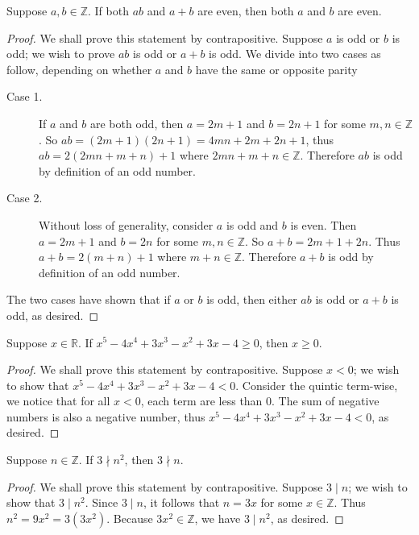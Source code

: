 \documentclass{exam}
\begin{document}
\begin{proposition}{5.7}
    Suppose $a,b\in\mathbb Z$. If both $ab$ and $a+b$ are even, then both $a$ and $b$ are even.
\end{proposition}

\begin{proof}
    We shall prove this statement by contrapositive. Suppose $a$ is odd or $b$ is odd; we wish to prove $ab$ is odd or $a+b$ is odd. We divide into two cases as follow, depending on whether $a$ and $b$ have the same or opposite parity
    \begin{description}
        \item[Case 1. ] If $a$ and $b$ are both odd, then $a=2m+1$ and $b=2n+1$ for some $m,n\in\mathbb Z$. So $ab = (2m+1)(2n+1) = 4mn+2m+2n+1$, thus $ab = 2(2mn+m+n) + 1$ where $2mn+m+n\in\mathbb Z$. Therefore $ab$ is odd by definition of an odd number.
        \item[Case 2. ] Without loss of generality, consider $a$ is odd and $b$ is even. Then $a = 2m+1$ and $b=2n$ for some $m,n\in\mathbb Z$. So $a + b = 2m + 1 + 2n$. Thus $a + b = 2(m+n) + 1$ where $m+n\in\mathbb Z$. Therefore $a + b$ is odd by definition of an odd number.
    \end{description}

    The two cases have shown that if $a$ or $b$ is odd, then either $ab$ is odd or $a+b$ is odd, as desired.
\end{proof}

\begin{proposition}{5.8}
    Suppose $x\in\mathbb R$. If $x^5-4x^4+3x^3-x^2+3x-4\ge0$, then $x\ge0$.
\end{proposition}

\begin{proof}
    We shall prove this statement by contrapositive. Suppose $x < 0$; we wish to show that $x^5-4x^4+3x^3-x^2+3x-4<0$. Consider the quintic term-wise, we notice that for all $x < 0$, each term are less than 0. The sum of negative numbers is also a negative number, thus $x^5-4x^4+3x^3-x^2+3x-4<0$, as desired.
\end{proof}

\begin{proposition}{5.9}
    Suppose $n\in\mathbb Z$. If $3\nmid n^2$, then $3\nmid n$.
\end{proposition}

\begin{proof}
    We shall prove this statement by contrapositive. Suppose $3\mid n$; we wish to show that $3\mid n^2$. Since $3\mid n$, it follows that $n = 3x$ for some $x\in\mathbb Z$. Thus $n^2 = 9x^2 = 3(3x^2)$. Because $3x^2\in\mathbb Z$, we have $3\mid n^2$, as desired.
\end{proof}
\end{document}
